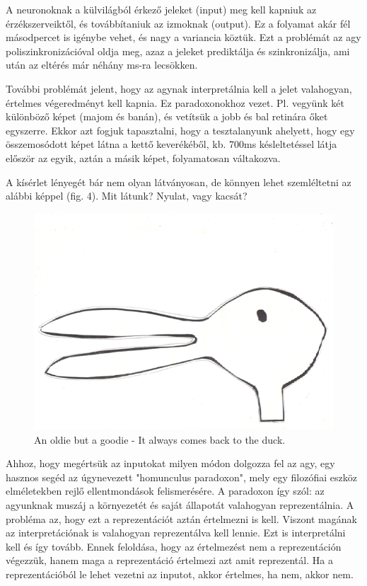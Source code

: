 \documentclass{article}
\begin{document}
A neuronoknak a külvilágból érkező jeleket (input) meg kell kapniuk az érzékszerveiktől, és továbbítaniuk az izmoknak (output). Ez a folyamat akár fél másodpercet is igénybe vehet, és nagy a variancia köztük. Ezt a problémát az agy poliszinkronizációval oldja meg, azaz a jeleket prediktálja és szinkronizálja, ami után az eltérés már néhány ms-ra lecsökken. \newline

További problémát jelent, hogy az agynak interpretálnia kell a jelet valahogyan, értelmes végeredményt kell kapnia. Ez paradoxonokhoz vezet. Pl. vegyünk két különböző képet (majom és banán), és vetítsük a jobb és bal retinára őket egyszerre. Ekkor azt fogjuk tapasztalni, hogy a tesztalanyunk ahelyett, hogy egy összemosódott képet látna a kettő keverékéből, kb. 700ms késleltetéssel látja először az egyik, aztán a másik képet, folyamatosan váltakozva.\newline

A kísérlet lényegét bár nem olyan látványosan, de könnyen lehet szemléltetni az alábbi képpel (fig. 4). Mit látunk? Nyulat, vagy kacsát? \newline

\begin{figure}[h!]
\centering
\includegraphics[width=\textwidth,height=\textheight,keepaspectratio]{duckrabbit.png}
\caption{An oldie but a goodie - It always comes back to the duck.}
\label{fig:duckrabbit}
\end{figure}

Ahhoz, hogy megértsük az inputokat milyen módon dolgozza fel az agy, egy hasznos segéd az úgynevezett "homunculus paradoxon", mely egy filozófiai eszköz elméletekben rejlő ellentmondások felismerésére. A paradoxon így szól: az agyunknak muszáj a környezetét és saját állapotát valahogyan reprezentálnia. A probléma az, hogy ezt a  reprezentációt aztán értelmezni is kell. Viszont magának az interpretációnak is valahogyan reprezentálva kell lennie. Ezt is interpretálni kell és így tovább. Ennek feloldása, hogy az értelmezést nem a reprezentáción végezzük, hanem maga a reprezentáció értelmezi azt amit reprezentál. Ha a reprezentációból le lehet vezetni az inputot, akkor értelmes, ha nem, akkor nem. \newline
\end{document}
